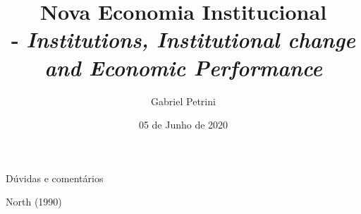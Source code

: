 \documentclass[11pt,lineno]{../style}
\title{
\large{Nova Economia Institucional}\vspace{2pt}\\
\Huge{\autor - \textit{Institutions, Institutional change and Economic Performance}}
}
\date{05 de Junho de 2020}
\author[$\ast$]{Gabriel Petrini}
\affil[$\ast$]{PhD Student at Unicamp.}
\newcommand{\autor}{North (1990) }
\begin{document}
\maketitle
\marginmark
\thispagestyle{firststyle}





	
\begin{redbox}{Dúvidas e comentários}
	
	\autor 	
\end{redbox}
\end{document}
